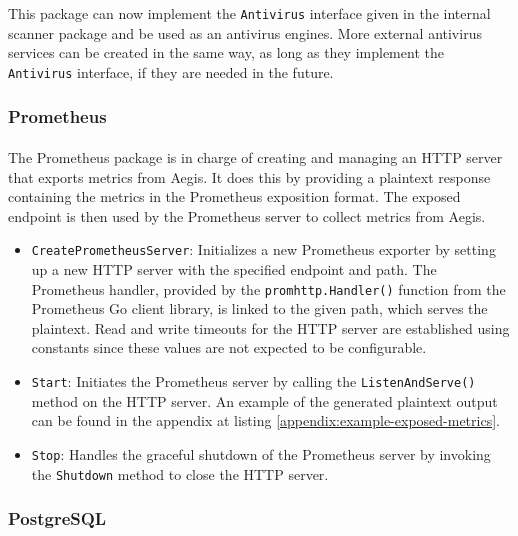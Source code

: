 \documentclass[12pt, conference, final, a4paper, onecolumn, compsoc]{IEEEtran}
\begin{document}
This package can now implement the \texttt{Antivirus} interface given in the
internal scanner package and be used as an antivirus engines. More external
antivirus services can be created in the same way, as long as they implement the
\texttt{Antivirus} interface, if they are needed in the future.

\subsubsection*{Prometheus}
\paragraph{}

The Prometheus package is in charge of creating and managing an HTTP server that
exports metrics from Aegis. It does this by providing a plaintext response
containing the metrics in the Prometheus exposition format. The exposed endpoint
is then used by the Prometheus server to collect metrics from Aegis.

\begin{itemize}
  \item \texttt{CreatePrometheusServer}: Initializes a new Prometheus exporter
        by setting up a new HTTP server with the specified endpoint and path.
        The Prometheus handler, provided by the \texttt{promhttp.Handler()}
        function from the Prometheus Go client library, is linked to the given
        path, which serves the plaintext. Read and write timeouts for the HTTP
        server are established using constants since these values are not
        expected to be configurable.
  \item \texttt{Start}: Initiates the Prometheus server by calling the
        \texttt{ListenAndServe()} method on the HTTP server. An example of the
        generated plaintext output can be found in the appendix at listing
        \ref{appendix:example-exposed-metrics}.
  \item \texttt{Stop}: Handles the graceful shutdown of the Prometheus server by
        invoking the \texttt{Shutdown} method to close the HTTP server.
\end{itemize}

\subsubsection*{PostgreSQL}
\paragraph{}
\end{document}
